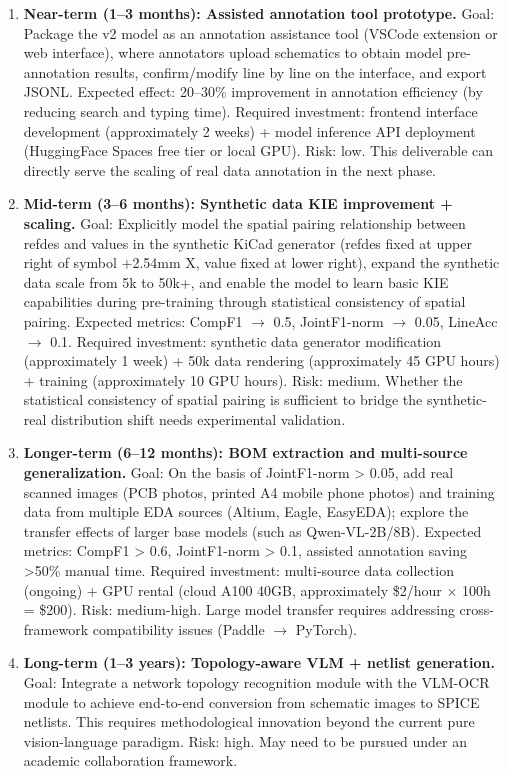 \begin{enumerate}
    \item \textbf{Near-term (1--3 months): Assisted annotation tool prototype.}
    Goal: Package the v2 model as an annotation assistance tool (VSCode extension or web interface), where annotators upload schematics to obtain model pre-annotation results, confirm/modify line by line on the interface, and export JSONL. Expected effect: 20--30\% improvement in annotation efficiency (by reducing search and typing time). Required investment: frontend interface development (approximately 2 weeks) + model inference API deployment (HuggingFace Spaces free tier or local GPU). Risk: low. This deliverable can directly serve the scaling of real data annotation in the next phase.

    \item \textbf{Mid-term (3--6 months): Synthetic data KIE improvement + scaling.}
    Goal: Explicitly model the spatial pairing relationship between refdes and values in the synthetic KiCad generator (refdes fixed at upper right of symbol +2.54mm X, value fixed at lower right), expand the synthetic data scale from 5k to 50k+, and enable the model to learn basic KIE capabilities during pre-training through statistical consistency of spatial pairing. Expected metrics: CompF1 $\to$ 0.5, JointF1-norm $\to$ 0.05, LineAcc $\to$ 0.1. Required investment: synthetic data generator modification (approximately 1 week) + 50k data rendering (approximately 45 GPU hours) + training (approximately 10 GPU hours). Risk: medium. Whether the statistical consistency of spatial pairing is sufficient to bridge the synthetic-real distribution shift needs experimental validation.

    \item \textbf{Longer-term (6--12 months): BOM extraction and multi-source generalization.}
    Goal: On the basis of JointF1-norm > 0.05, add real scanned images (PCB photos, printed A4 mobile phone photos) and training data from multiple EDA sources (Altium, Eagle, EasyEDA); explore the transfer effects of larger base models (such as Qwen-VL-2B/8B). Expected metrics: CompF1 > 0.6, JointF1-norm > 0.1, assisted annotation saving >50\% manual time. Required investment: multi-source data collection (ongoing) + GPU rental (cloud A100 40GB, approximately \$2/hour $\times$ 100h = \$200). Risk: medium-high. Large model transfer requires addressing cross-framework compatibility issues (Paddle $\to$ PyTorch).

    \item \textbf{Long-term (1--3 years): Topology-aware VLM + netlist generation.}
    Goal: Integrate a network topology recognition module with the VLM-OCR module to achieve end-to-end conversion from schematic images to SPICE netlists. This requires methodological innovation beyond the current pure vision-language paradigm. Risk: high. May need to be pursued under an academic collaboration framework.
\end{enumerate}


